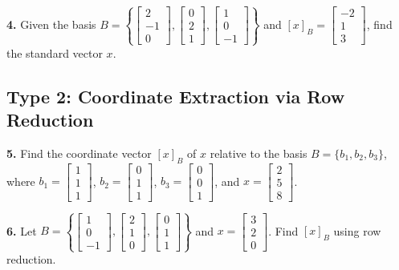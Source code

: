 \documentclass{article}
\begin{document}
\vspace{0.2cm}
\textbf{4.} Given the basis $B = \left\{ \begin{bmatrix} 2 \\ -1 \\ 0 \end{bmatrix}, \begin{bmatrix} 0 \\ 2 \\ 1 \end{bmatrix}, \begin{bmatrix} 1 \\ 0 \\ -1 \end{bmatrix} \right\}$ and $[x]_B = \begin{bmatrix} -2 \\ 1 \\ 3 \end{bmatrix}$, find the standard vector $x$.

\subsection*{Type 2: Coordinate Extraction via Row Reduction}
\textbf{5.} Find the coordinate vector $[x]_B$ of $x$ relative to the basis $B = \{b_1, b_2, b_3\}$, where $b_1 = \begin{bmatrix} 1 \\ 1 \\ 1 \end{bmatrix}$, $b_2 = \begin{bmatrix} 0 \\ 1 \\ 1 \end{bmatrix}$, $b_3 = \begin{bmatrix} 0 \\ 0 \\ 1 \end{bmatrix}$, and $x = \begin{bmatrix} 2 \\ 5 \\ 8 \end{bmatrix}$.

\vspace{0.2cm}
\textbf{6.} Let $B = \left\{ \begin{bmatrix} 1 \\ 0 \\ -1 \end{bmatrix}, \begin{bmatrix} 2 \\ 1 \\ 0 \end{bmatrix}, \begin{bmatrix} 0 \\ 1 \\ 1 \end{bmatrix} \right\}$ and $x = \begin{bmatrix} 3 \\ 2 \\ 0 \end{bmatrix}$. Find $[x]_B$ using row reduction.
\end{document}
